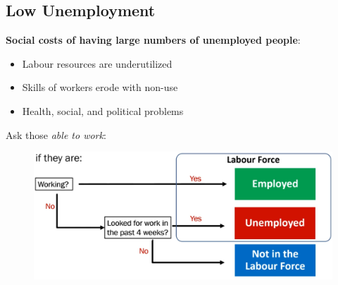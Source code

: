 \documentclass{article}
\begin{document}
\begin{multicols}{2}
\subsection{Low Unemployment}
\textbf{Social costs of having large numbers of unemployed people}:
\begin{itemize}
	\item Labour resources are underutilized
	\item Skills of workers erode with non-use
	\item Health, social, and political problems
\end{itemize}
Ask those \textit{able to work}:
\begin{figure}[H]
	\centering
	\includegraphics[width=\columnwidth]{images/unemployment.png}
\end{figure}


\end{multicols}
\end{document}
